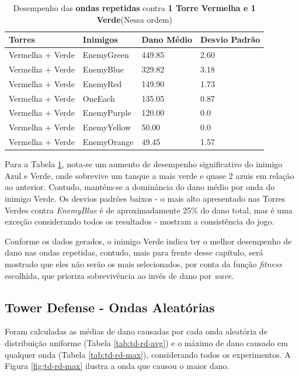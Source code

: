 \begin{table}[H]
\caption{Desempenho das \textbf{ondas repetidas} contra \textbf{1 Torre Vermelha e 1 Verde}(Nessa ordem)}
\begin{tabular}{l|l|ll}
Torres            & Inimigos & Dano Médio & Desvio Padrão \\ \hline
Vermelha + Verde  & EnemyGreen      & 449.85     & 2.60          \\
Vermelha + Verde  & EnemyBlue       & 329.82     & 3.18          \\
Vermelha + Verde  & EnemyRed        & 149.90     & 1.73          \\
Vermelha + Verde  & OneEach         & 135.05     & 0.87          \\
Vermelha + Verde  & EnemyPurple     & 120.00     & 0.0           \\
Vermelha + Verde  & EnemyYellow     & 50.00      & 0.0           \\
Vermelha + Verde  & EnemyOrange     & 49.45      & 1.57          
\end{tabular}
\label{tab:redgreen}
\end{table}

Para a Tabela \ref{tab:redgreen}, nota-se um aumento de desempenho significativo do inimigo Azul e Verde, onde sobrevive um tanque a mais verde e quase 2 azuis em relação ao anterior. Contudo, mantém-se a dominância do dano médio por onda do inimigo Verde. Os desvios padrões baixos - o mais alto apresentado nas Torres Verdes contra \textit{EnemyBlue} é de aproximadamente 25\% do dano total, mas é uma exceção considerando todos os resultados - mostram a consistência do jogo.

Conforme os dados gerados, o inimigo Verde indica ter o melhor desempenho de dano nas ondas repetidas, contudo, mais para frente desse capítulo, será mostrado que eles não serão os mais selecionados, por conta da função \textit{fitness} escolhida, que prioriza sobrevivência ao invés de dano por \textit{wave}.

\subsection{Tower Defense - Ondas Aleatórias}
\label{sec:rd-td}

Foram calculadas as médias de dano causadas por cada onda aleatória de distribuição uniforme (Tabela \ref{tab:td-rd-avg}) e o máximo de dano causado em qualquer onda (Tabela \ref{tab:td-rd-max}), considerando todos os experimentos. A Figura \ref{fig:td-rd-max} ilustra a onda que causou o maior dano.

